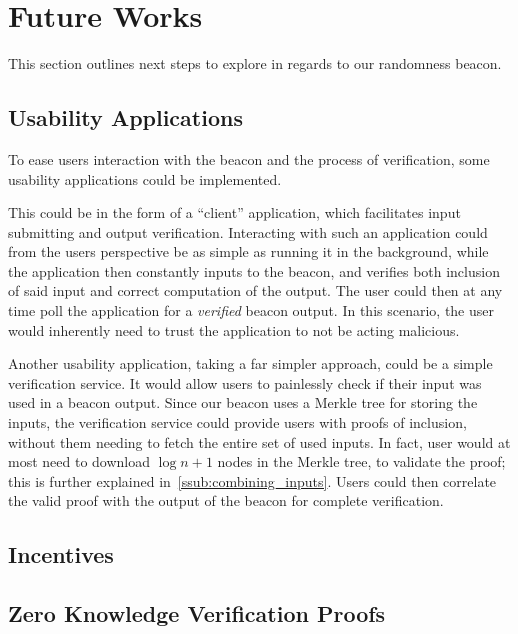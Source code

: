 \section{Future Works}%
\label{sec:future_works}
This section outlines next steps to explore in regards to our randomness beacon.


\subsection{Usability Applications}%
\label{sub:usability_applications}
To ease users interaction with the beacon and the process of verification, some usability applications could be implemented.

This could be in the form of a \enquote{client} application, which facilitates input submitting and output verification.
Interacting with such an application could from the users perspective be as simple as running it in the background, while the application then constantly inputs to the beacon, and verifies both inclusion of said input and correct computation of the output.
The user could then at any time poll the application for a \emph{verified} beacon output.
In this scenario, the user would inherently need to trust the application to not be acting malicious.

Another usability application, taking a far simpler approach, could be a simple verification service.
It would allow users to painlessly check if their input was used in a beacon output.
Since our beacon uses a Merkle tree for storing the inputs, the verification service could provide users with proofs of inclusion, without them needing to fetch the entire set of used inputs.
In fact, user would at most need to download $\log n + 1$ nodes in the Merkle tree, to validate the proof; this is further explained in~\vref{ssub:combining_inputs}.
Users could then correlate the valid proof with the output of the beacon for complete verification.

\subsection{Incentives}

\subsection{Zero Knowledge Verification Proofs}%
\label{sub:zero_knowledge_verification_proofs}
